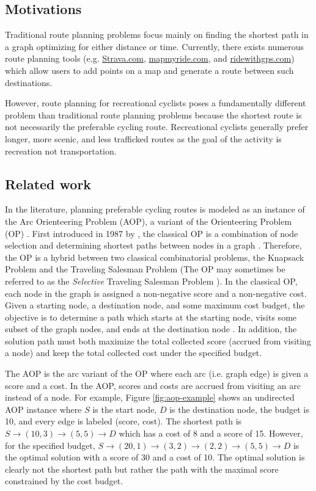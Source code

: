 \documentclass[11pt]{article}
\newcommand{\td}{\todo[inline]}
\begin{document}
\subsection{Motivations}
Traditional route planning problems focus mainly on finding the shortest path in a graph optimizing for either distance or time. Currently, there exists numerous route planning tools (e.g. \href{https://www.strava.com/routes/new}{Strava.com}, \href{https://www.mapmyride.com}{mapmyride.com}, and \href{https://ridewithgps.com}{ridewithgps.com}) which allow users to add points on a map and generate a route between such destinations.

However, route planning for recreational cyclists poses a fundamentally different problem than traditional route planning problems because the shortest route is not necessarily the 	preferable cycling route. Recreational cyclists generally prefer longer, more scenic, and less trafficked routes as the goal of the activity is recreation not transportation. 



\subsection{Related work} \label{relatedwork}
In the literature, planning preferable cycling routes is modeled as an instance of the Arc Orienteering Problem (AOP), a variant of the Orienteering Problem (OP) \cite{souffriau2011planning}. First introduced in 1987 by \citeauthor{golden1987orienteering}, the classical OP is a combination of node selection and determining shortest paths between nodes in a graph \cite{golden1987orienteering}. Therefore, the OP is a hybrid between two classical combinatorial problems, the Knapsack Problem and the Traveling Salesman Problem (The OP may sometimes be referred to as the \emph{Selective} Traveling Salesman Problem \cite{laporte1990selective}). In the classical OP, each node in the graph is assigned a non-negative score and a non-negative cost. Given a starting node, a destination node, and some maximum cost budget, the objective is to determine a path which starts at the starting node, visits some subset of the graph nodes, and ends at the destination node \cite{gunawan2016orienteering}. In addition, the solution path must both maximize the total collected score (accrued from visiting a node) and keep the total collected cost under the specified budget.

The AOP is the arc variant of the OP where each arc (i.e. graph edge) is given a score and a cost. In the AOP, scores and costs are accrued from visiting an arc instead of a node. For example, Figure \ref{fig:aop-example} shows an undirected AOP instance where $S$ is the start node, $D$ is the destination node, the budget is 10, and every edge is labeled (score, cost). The shortest path is $S \rightarrow (10,3) \rightarrow (5,5) \rightarrow D$ which has a cost of 8 and a score of 15. However, for the specified budget, $S \rightarrow (20,1) \rightarrow (3,2) \rightarrow (2,2) \rightarrow (5,5) \rightarrow D$ is the optimal solution with a score of 30 and a cost of 10. The optimal solution is clearly not the shortest path but rather the path with the maximal score constrained by the cost budget.
\end{document}
